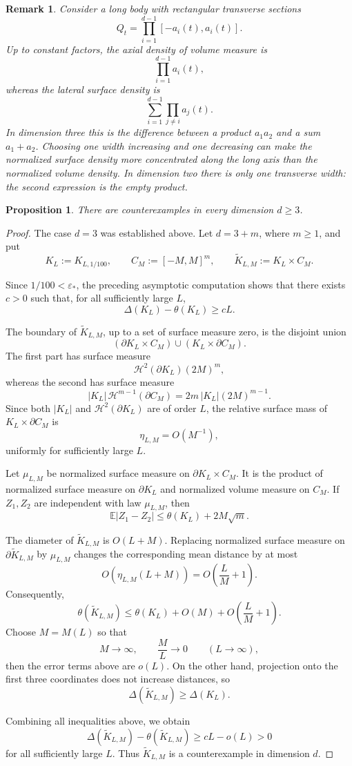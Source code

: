 \documentclass[final,12pt]{elsarticle}
\numberwithin{equation}{section}
\newtheorem{prop}[thm]{Proposition}
\newtheorem{rem}[thm]{Remark}
\theoremstyle{remark}
\theoremstyle{definition}
\begin{document}
\begin{rem}\label{rmk:why}
    Consider a long body with rectangular transverse sections
$$
Q_t=\prod_{i=1}^{d-1}[-a_i(t),a_i(t)].
$$
Up to constant factors, the axial density of volume measure is
$$
\prod_{i=1}^{d-1}a_i(t),
$$
whereas the lateral surface density is
$$
\sum_{i=1}^{d-1}\prod_{j\neq i}a_j(t).
$$
In dimension three this is the difference between a product $a_1a_2$ and a sum $a_1+a_2$. Choosing one width increasing and one decreasing can make the normalized surface density more concentrated along the long axis than the normalized volume density.  In dimension two there is only one transverse width: the second expression is the empty product. 
\end{rem}



\begin{prop}\label{prop:counter-ex}
There are counterexamples in every dimension $d\geq3$.
\end{prop}
\begin{proof}
The case $d=3$ was established above. Let $d=3+m$, where $m\ge 1$, and put
$$
K_L:=K_{L,1/100},
\qquad
C_M:=[-M,M]^m,
\qquad
\widetilde K_{L,M}:=K_L\times C_M .
$$

Since $1/100<\varepsilon_*$, the preceding asymptotic computation shows that there exists
$c>0$ such that, for all sufficiently large $L$,
$$
\Delta(K_L)-\theta(K_L)\ge cL.
$$

The boundary of $\widetilde K_{L,M}$, up to a set of surface measure zero, is the disjoint union
$$
(\partial K_L\times C_M)\cup(K_L\times\partial C_M).
$$
The first part has surface measure
$$
\mathcal H^2(\partial K_L)(2M)^m,
$$
whereas the second has surface measure
$$
|K_L|\,\mathcal H^{m-1}(\partial C_M)
=
2m\,|K_L|(2M)^{m-1}.
$$
Since both $|K_L|$ and $\mathcal H^2(\partial K_L)$ are of order $L$, the relative surface
mass of $K_L\times\partial C_M$ is
$$
\eta_{L,M}=O(M^{-1}),
$$
uniformly for sufficiently large $L$.

Let $\mu_{L,M}$ be normalized surface measure on
$\partial K_L\times C_M$. It is the product of normalized surface measure on
$\partial K_L$ and normalized volume measure on $C_M$. If $Z_1,Z_2$ are independent with law $\mu_{L,M}$, then
$$
\mathbb E|Z_1-Z_2|
\le \theta(K_L)+2M\sqrt m.
$$

The diameter of $\widetilde K_{L,M}$ is $O(L+M)$. Replacing normalized surface
measure on $\partial\widetilde K_{L,M}$ by $\mu_{L,M}$ changes the corresponding mean
distance by at most
$$
O\!\left(\eta_{L,M}(L+M)\right)
=
O\!\left(\frac{L}{M}+1\right).
$$
Consequently,
$$
\theta(\widetilde K_{L,M})
\le
\theta(K_L)
+
O(M)
+
O\!\left(\frac{L}{M}+1\right).
$$
Choose $M=M(L)$ so that
$$
M\longrightarrow\infty,
\qquad
\frac{M}{L}\longrightarrow0
\qquad (L\to\infty),
$$
then the error terms above are $o(L)$.
On the other hand, projection onto the first three coordinates does not increase distances, so
$$
\Delta(\widetilde K_{L,M})\ge \Delta(K_L).
$$

 Combining all inequalities above, we obtain
$$
\Delta(\widetilde K_{L,M})-\theta(\widetilde K_{L,M})
\ge
cL-o(L)>0
$$
for all sufficiently large $L$. Thus $\widetilde K_{L,M}$ is a counterexample in
dimension $d$.
\end{proof}
\end{document}
